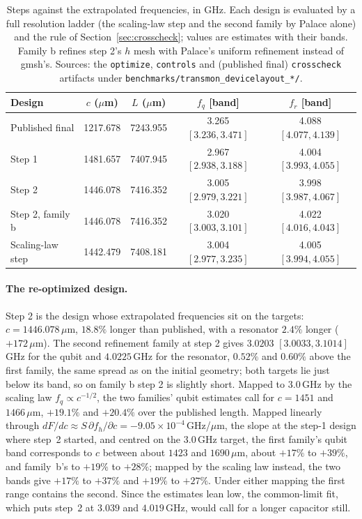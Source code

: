 \documentclass{anvil-paper}
\begin{document}
\begin{table}[htbp]
  \centering
  \caption{Steps against the extrapolated frequencies, in GHz. Each design
  is evaluated by a full resolution ladder (the scaling-law step and the
  second family by Palace alone) and the rule of
  Section~\ref{sec:crosscheck}; values are estimates with their bands.
  Family b refines step 2's $h$ mesh with Palace's uniform refinement
  instead of gmsh's. Sources: the \texttt{optimize}, \texttt{controls} and
  (published final) \texttt{crosscheck} artifacts under
  \texttt{benchmarks/transmon\_devicelayout\_*/}.}
  \label{tab:newton-conv}
  \footnotesize
  \begin{tabular}{@{}lcccc@{}}
    \toprule
    Design & $c$ ($\mu$m) & $L$ ($\mu$m) & $f_q$ [band] & $f_r$ [band] \\
    \midrule
    Published final & 1217.678 & 7243.955 & 3.265 $[3.236, 3.471]$ & 4.088 $[4.077, 4.139]$ \\
    Step 1 & 1481.657 & 7407.945 & 2.967 $[2.938, 3.188]$ & 4.004 $[3.993, 4.055]$ \\
    Step 2 & 1446.078 & 7416.352 & 3.005 $[2.979, 3.221]$ & 3.998 $[3.987, 4.067]$ \\
    Step 2, family b & 1446.078 & 7416.352 & 3.020 $[3.003, 3.101]$ & 4.022 $[4.016, 4.043]$ \\
    Scaling-law step & 1442.479 & 7408.181 & 3.004 $[2.977, 3.235]$ & 4.005 $[3.994, 4.055]$ \\
    \bottomrule
  \end{tabular}
\end{table}

\paragraph{The re-optimized design.}
Step 2 is the design whose extrapolated frequencies sit on the targets:
$c = 1446.078\,\mu$m, $18.8\%$ longer than published, with a resonator
$2.4\%$ longer ($+172\,\mu$m). The second refinement family at step 2 gives
$3.0203$ $[3.0033, 3.1014]$\,GHz for the qubit and $4.0225$\,GHz for the
resonator, $0.52\%$ and $0.60\%$ above the first family, the same spread as
on the initial geometry; both targets lie just below its band, so on family
b step 2 is slightly short. Mapped to $3.0$\,GHz by the scaling law $f_q
\propto c^{-1/2}$, the two families' qubit estimates call for $c = 1451$ and
$1466\,\mu$m, $+19.1\%$ and $+20.4\%$ over the published length. Mapped
linearly through $dF/dc \approx
S\,\partial f_h/\partial c = -9.05\times10^{-4}$\,GHz/$\mu$m, the slope at
the step-1 design where step~2 started, and centred on the $3.0$\,GHz
target, the first family's qubit band corresponds to $c$ between about
$1423$ and $1690\,\mu$m, about $+17\%$ to $+39\%$, and family~b's to
$+19\%$ to $+28\%$; mapped by the scaling law instead, the two bands give
$+17\%$ to $+37\%$ and $+19\%$ to $+27\%$. Under either mapping the first
range contains the second. Since the estimates lean low, the common-limit
fit, which puts step~2 at $3.039$ and $4.019$\,GHz, would call for a longer
capacitor still.
\end{document}
